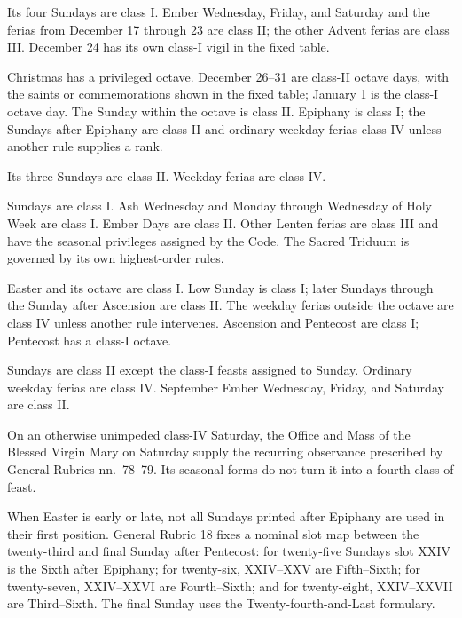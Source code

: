 \begin{description}[style=multiline,leftmargin=0.25\linewidth,labelwidth=0.22\linewidth,itemsep=0.5em]
\item[Advent] Its four Sundays are class I. Ember Wednesday, Friday, and Saturday and the ferias from December 17 through 23 are class II; the other Advent ferias are class III. December 24 has its own class-I vigil in the fixed table.
\item[Christmas cycle] Christmas has a privileged octave. December 26--31 are class-II octave days, with the saints or commemorations shown in the fixed table; January 1 is the class-I octave day. The Sunday within the octave is class II. Epiphany is class I; the Sundays after Epiphany are class II and ordinary weekday ferias class IV unless another rule supplies a rank.
\item[Septuagesima] Its three Sundays are class II. Weekday ferias are class IV.
\item[Lent and Passiontide] Sundays are class I. Ash Wednesday and Monday through Wednesday of Holy Week are class I. Ember Days are class II. Other Lenten ferias are class III and have the seasonal privileges assigned by the Code. The Sacred Triduum is governed by its own highest-order rules.
\item[Easter cycle] Easter and its octave are class I. Low Sunday is class I; later Sundays through the Sunday after Ascension are class II. The weekday ferias outside the octave are class IV unless another rule intervenes. Ascension and Pentecost are class I; Pentecost has a class-I octave.
\item[After Pentecost] Sundays are class II except the class-I feasts assigned to Sunday. Ordinary weekday ferias are class IV. September Ember Wednesday, Friday, and Saturday are class II.
\end{description}

On an otherwise unimpeded class-IV Saturday, the Office and Mass of the Blessed Virgin Mary on Saturday supply the recurring observance prescribed by General Rubrics nn.~78--79. Its seasonal forms do not turn it into a fourth class of feast.

When Easter is early or late, not all Sundays printed after Epiphany are used in their first position. General Rubric 18 fixes a nominal slot map between the twenty-third and final Sunday after Pentecost: for twenty-five Sundays slot XXIV is the Sixth after Epiphany; for twenty-six, XXIV--XXV are Fifth--Sixth; for twenty-seven, XXIV--XXVI are Fourth--Sixth; and for twenty-eight, XXIV--XXVII are Third--Sixth. The final Sunday uses the Twenty-fourth-and-Last formulary.


